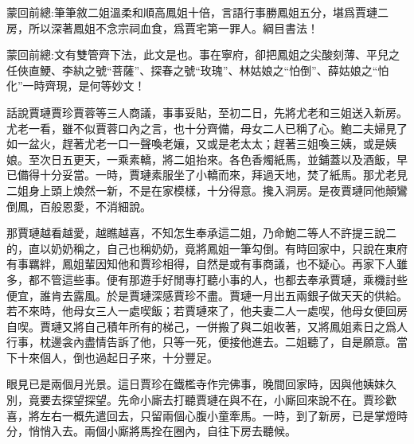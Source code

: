 

\begin{parag}
    \begin{note}蒙回前總:筆筆敘二姐溫柔和順高鳳姐十倍，言語行事勝鳳姐五分，堪爲賈璉二房，所以深著鳳姐不念宗祠血食，爲賈宅第一罪人。綱目書法！\end{note}
\end{parag}


\begin{parag}
    \begin{note}蒙回前總:文有雙管齊下法，此文是也。事在寧府，卻把鳳姐之尖酸刻薄、平兒之任俠直鯁、李紈之號“菩薩”、探春之號“玫瑰”、林姑娘之“怕倒”、薛姑娘之“怕化”一時齊現，是何等妙文！\end{note}
\end{parag}


\begin{parag}
    話說賈璉賈珍賈蓉等三人商議，事事妥貼，至初二日，先將尤老和三姐送入新房。尤老一看，雖不似賈蓉口內之言，也十分齊備，母女二人已稱了心。鮑二夫婦見了如一盆火，趕著尤老一口一聲喚老孃，又或是老太太；趕著三姐喚三姨，或是姨娘。至次日五更天，一乘素轎，將二姐抬來。各色香燭紙馬，並鋪蓋以及酒飯，早已備得十分妥當。一時，賈璉素服坐了小轎而來，拜過天地，焚了紙馬。那尤老見二姐身上頭上煥然一新，不是在家模樣，十分得意。攙入洞房。是夜賈璉同他顛鸞倒鳳，百般恩愛，不消細說。
\end{parag}


\begin{parag}
    那賈璉越看越愛，越瞧越喜，不知怎生奉承這二姐，乃命鮑二等人不許提三說二的，直以奶奶稱之，自己也稱奶奶，竟將鳳姐一筆勾倒。有時回家中，只說在東府有事羈絆，鳳姐輩因知他和賈珍相得，自然是或有事商議，也不疑心。再家下人雖多，都不管這些事。便有那遊手好閒專打聽小事的人，也都去奉承賈璉，乘機討些便宜，誰肯去露風。於是賈璉深感賈珍不盡。賈璉一月出五兩銀子做天天的供給。若不來時，他母女三人一處喫飯；若賈璉來了，他夫妻二人一處喫，他母女便回房自喫。賈璉又將自己積年所有的梯己，一併搬了與二姐收著，又將鳳姐素日之爲人行事，枕邊衾內盡情告訴了他，只等一死，便接他進去。二姐聽了，自是願意。當下十來個人，倒也過起日子來，十分豐足。
\end{parag}


\begin{parag}
    眼見已是兩個月光景。這日賈珍在鐵檻寺作完佛事，晚間回家時，因與他姨妹久別，竟要去探望探望。先命小廝去打聽賈璉在與不在，小廝回來說不在。賈珍歡喜，將左右一概先遣回去，只留兩個心腹小童牽馬。一時，到了新房，已是掌燈時分，悄悄入去。兩個小廝將馬拴在圈內，自往下房去聽候。
\end{parag}


